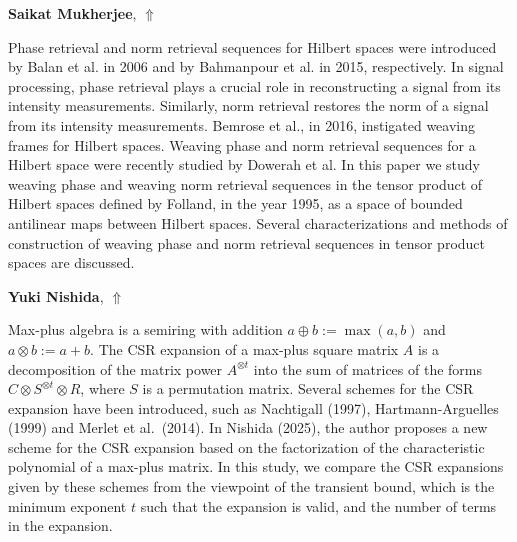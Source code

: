 \documentclass[ILAS2025-program.tex]{subfiles}
\begin{document}
\hypertarget{down0415}{}\begin{ilasabstract}
    
\textbf{Saikat Mukherjee},  \hfill \hyperlink{up0415}{$\Uparrow$}
    
    
\mtskip
    Phase retrieval and norm retrieval sequences for Hilbert spaces were introduced by Balan et al. in 2006 and by Bahmanpour et al. in 2015, respectively. In signal processing, phase retrieval plays a crucial role in reconstructing a signal from its intensity measurements. Similarly, norm retrieval restores the norm of a signal from its intensity measurements. Bemrose et al., in 2016, instigated weaving frames for Hilbert spaces. Weaving phase and norm retrieval sequences for a Hilbert space were recently studied by Dowerah et al. In this paper we study weaving phase and weaving norm retrieval sequences in the tensor product of Hilbert spaces defined by Folland, in the year 1995, as a space of bounded antilinear maps between Hilbert spaces. Several characterizations and methods of construction of weaving phase and norm retrieval sequences in tensor product spaces are discussed. 

\end{ilasabstract}
    

\hypertarget{down0398}{}\begin{ilasabstract}
    
\textbf{Yuki Nishida},  \hfill \hyperlink{up0398}{$\Uparrow$}
    
    
\mtskip
    Max-plus algebra is a semiring with addition $a\oplus b := \max(a,b)$ and $a\otimes b := a+b$. The CSR expansion of a max-plus square matrix $A$ is a decomposition of the matrix power $A^{\otimes t}$ into the sum of matrices of the forms $C \otimes S^{\otimes t} \otimes R$, where $S$ is a permutation matrix. Several schemes for the CSR expansion have been introduced, such as Nachtigall (1997), Hartmann-Arguelles (1999) and Merlet et al.~(2014). In Nishida (2025), the author proposes a new scheme for the CSR expansion based on the factorization of the characteristic polynomial of a max-plus matrix. In this study, we compare the CSR expansions given by these schemes from the viewpoint of the transient bound, which is the minimum exponent $t$ such that the expansion is valid, and the number of terms in the expansion.
\end{ilasabstract}
    
\end{document}
